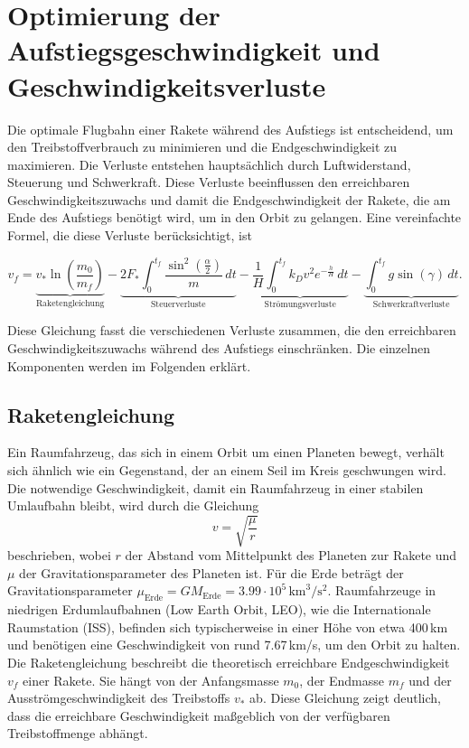 %
%
%
%

\section{Optimierung der Aufstiegsgeschwindigkeit und Geschwindigkeitsverluste \label{leo:section:aufstiegsgleichung}}

Die optimale Flugbahn einer Rakete während des Aufstiegs ist entscheidend, um den Treibstoffverbrauch zu minimieren und die Endgeschwindigkeit zu maximieren. 
Die Verluste entstehen hauptsächlich durch Luftwiderstand, Steuerung und Schwerkraft. 
Diese Verluste beeinflussen den erreichbaren Geschwindigkeitszuwachs und damit die Endgeschwindigkeit der Rakete, die am Ende des Aufstiegs benötigt wird, um in den Orbit zu gelangen. 
Eine vereinfachte Formel, die diese Verluste berücksichtigt, ist

\begin{equation}
	v_f = \underbrace{v_* \ln \left(\frac{m_0}{m_f}\right)}_{\text{Raketengleichung}} 
	- \underbrace{2F_* \int_0^{t_f} \frac{\sin^2\left(\frac{\alpha}{2}\right)}{m} \, dt }_{\text{Steuerverluste}}
	- \underbrace{\frac{1}{H} \int_0^{t_f} k_Dv^2 e^{-\frac{h}{H}} \, dt }_{\text{Strömungsverluste}}
	- \underbrace{\int_0^{t_f} g \sin \left(\gamma\right) \, dt}_{\text{Schwerkraftverluste}}.
	\label{leo:aufstiegsgleichung}
\end{equation}

Diese Gleichung fasst die verschiedenen Verluste zusammen, die den erreichbaren Geschwindigkeitszuwachs während des Aufstiegs einschränken. 
Die einzelnen Komponenten werden im Folgenden erklärt.

\subsection{Raketengleichung \label{leo:section:raketengleichung}}
Ein Raumfahrzeug, das sich in einem Orbit um einen Planeten bewegt, verhält sich ähnlich wie ein Gegenstand, der an einem Seil im Kreis geschwungen wird. 
Die notwendige Geschwindigkeit, damit ein Raumfahrzeug in einer stabilen Umlaufbahn bleibt, wird durch die Gleichung
\[
v = \sqrt{\frac{\mu}{r}}
\]
beschrieben, wobei \(r\) der Abstand vom Mittelpunkt des Planeten zur Rakete und \(\mu\) der Gravitationsparameter des Planeten ist.
Für die Erde beträgt der Gravitationsparameter $\mu_{\text{Erde}} = GM_{\text{Erde}} = 3.99 \cdot 10^5\,\text{km}^3/\text{s}^2$. 
Raumfahrzeuge in niedrigen Erdumlaufbahnen (Low Earth Orbit, LEO), wie die Internationale Raumstation (ISS), befinden sich typischerweise in einer Höhe von etwa 400\,km und benötigen eine Geschwindigkeit von rund 7.67\,km/s, um den Orbit zu halten.
Die Raketengleichung beschreibt die theoretisch erreichbare Endgeschwindigkeit \(v_f\) einer Rakete. 
Sie hängt von der Anfangsmasse \(m_0\), der Endmasse \(m_f\) und der Ausströmgeschwindigkeit des Treibstoffs \(v_*\) ab. 
Diese Gleichung zeigt deutlich, dass die erreichbare Geschwindigkeit maßgeblich von der verfügbaren Treibstoffmenge abhängt.

